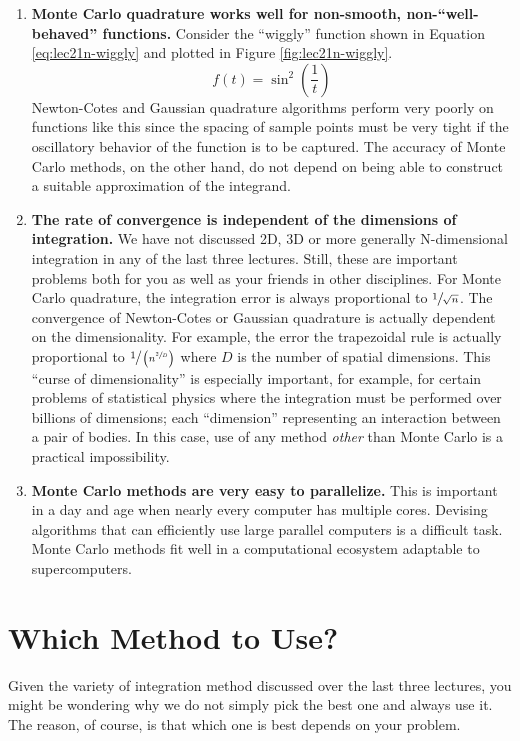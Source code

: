 \begin{enumerate}
\item \textbf{Monte Carlo quadrature works well for non-smooth, non-``well-behaved'' functions.}  Consider the ``wiggly'' function shown in Equation \ref{eq:lec21n-wiggly} and plotted in Figure \ref{fig:lec21n-wiggly}.    
\begin{equation}
f(t) = \sin^2{\left(\frac{1}{t} \right)}
\label{eq:lec21n-wiggly}
\end{equation}
Newton-Cotes and Gaussian quadrature algorithms perform very poorly on functions like this since the spacing of sample points must be very tight if the oscillatory behavior of the function is to be captured.  The accuracy of Monte Carlo methods, on the other hand, do not depend on being able to construct a suitable approximation of the integrand.  

\item \textbf{The rate of convergence is independent of the dimensions of integration.} We have not discussed 2D, 3D or more generally N-dimensional integration in any of the last three lectures.  Still, these are important problems both for you as well as your friends in other disciplines.  For Monte Carlo quadrature, the integration error is always proportional to $\sfrac{1}{\sqrt{n}}$.  The convergence of Newton-Cotes or Gaussian quadrature is actually dependent on the dimensionality.  For example, the error the trapezoidal rule is actually proportional to $\sfrac{1}{\left(n^{\sfrac{2}{D}}\right)}$ where $D$ is the number of spatial dimensions.  This ``curse of dimensionality'' is especially important, for example, for certain problems of statistical physics where the integration must be performed over billions of dimensions; each ``dimension'' representing an interaction between a pair of bodies.  In this case, use of any method \emph{other} than Monte Carlo is a practical impossibility.

\item \textbf{Monte Carlo methods are very easy to parallelize.} This is important in a day and age when nearly every computer has multiple cores.  Devising algorithms that can efficiently use large parallel computers is a difficult task.  Monte Carlo methods fit well in a computational ecosystem adaptable to supercomputers.

\end{enumerate}

\section{Which Method to Use?}
Given the variety of integration method discussed over the last three lectures, you might be wondering why we do not simply pick the best one and always use it.  The reason, of course, is that which one is best depends on your problem.  

